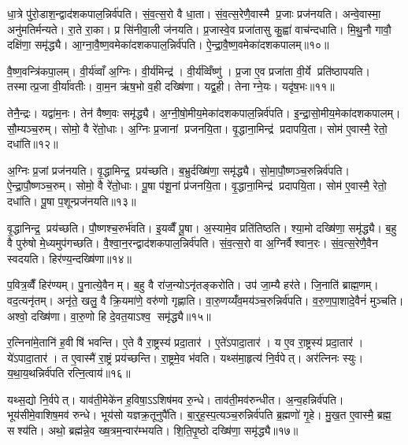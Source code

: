 धा॒त्रे पु॑रो॒डाश॒न्द्वाद॑शकपाल॒न्निर्व॑पति। सं॒व॒त्स॒रो वै धा॒ता। सं॒व॒त्स॒रेणै॒वास्मै प्र॒जाः प्रज॑नयति। अन्वे॒वास्मा॒ अनु॑मतिर्मन्यते। रा॒ते रा॒का। प्र सि॑नीवा॒ली ज॑नयति। प्र॒जास्वे॒व प्रजा॑तासु कु॒ह्वा॑ वाच॑न्दधाति। मि॒थु॒नौ गावौ॒ दक्षि॑णा॒ समृ॑द्ध्यै। आ॒ग्ना॒वै॒ष्ण॒वमेका॑दशकपाल॒न्निर्व॑पति। ऐ॒न्द्रा॒वै॒ष्ण॒वमेका॑दशकपालम्॥१०॥

वै॒ष्ण॒वन्त्रि॑कपा॒लम्। वी॒र्य॑व्वाँ अ॒ग्निः। वी॒र्य॑मिन्द्र॑। वी॒र्य॑व्विँष्णु॑। प्र॒जा ए॒व प्रजा॑ता वी॒र्ये प्रति॑ष्ठापयति। तस्मात्प्र॒जा वी॒र्या॑वतीः। वा॒म॒न ऋ॑ष॒भो व॒ही दख्षि॑णा। यद्व॒ही। तेनाग्ने॒यः। यदृ॑ष॒भः॥११॥

तेनै॒न्द्रः। यद्वा॑म॒नः। तेन॑ वैष्ण॒वः समृ॑द्ध्यै। अ॒ग्नी॒षो॒मीय॒मेका॑दशकपाल॒न्निर्व॑पति। इ॒न्द्रा॒सो॒मीय॒मेका॑दशकपालम्। सौ॒म्यञ्च॒रुम्। सोमो॒ वै रे॑तो॒धाः। अ॒ग्निः प्र॒जानां प्रजनयि॒ता। वृ॒द्धाना॒मिन्द्र॑ प्रदापयि॒ता। सोम॑ ए॒वास्मै॒ रेतो॒ दधा॑ति॥१२॥

अ॒ग्निः प्र॒जां प्रज॑नयति। वृ॒द्धामिन्द्र॒ प्रय॑च्छति। ब॒भ्रुर्दख्षि॑णा॒ समृ॑द्ध्यै। सो॒मा॒पौ॒ष्णञ्च॒रुन्निर्व॑पति। ऐ॒न्द्रा॒पौ॒ष्णञ्च॒रुम्। सोमो॒ वै रे॑तो॒धाः। पू॒षा प॑शू॒नां प्र॑जनयि॒ता। वृ॒द्धाना॒मिन्द्र॑ प्रदापयि॒ता। सोम॑ ए॒वास्मै॒ रेतो॒ दधा॑ति। पू॒षा प॒शून्प्रज॑नयति॥१३॥

वृ॒द्धानिन्द्र॒ प्रय॑च्छति। पौ॒ष्णश्च॒रुर्भ॑वति। इ॒यव्वैँ पू॒षा। अ॒स्यामे॒व प्रति॑तिष्ठति। श्या॒मो दख्षि॑णा॒ समृ॑द्ध्यै। ब॒हु वै पुरु॑षो मे॒ध्यमुप॑गच्छति। वै॒श्वा॒न॒रन्द्वाद॑शकपाल॒न्निर्व॑पति। सं॒व॒त्स॒रो वा अ॒ग्निर्वैश्वान॒रः। सं॒व॒त्स॒रेणै॒वैन स्वदयति। हिर॑ण्य॒न्दख्षि॑णा॥१४॥

प॒वित्र॒व्वैँ हिर॑ण्यम्। पु॒नात्ये॒वैनम्। ब॒हु वै रा॑ज॒न्योऽनृ॑तङ्करोति। उप॑ जा॒म्यै हर॑ते। जि॒नाति॑ ब्राह्म॒णम्। वद॒त्यनृ॑तम्। अनृ॑ते॒ खलु॒ वै क्रि॒यमा॑णे॒ वरु॑णो गृह्णाति। वा॒रु॒णय्यँ॑व॒मय॑ञ्च॒रुन्निर्व॑पति। व॒रु॒ण॒पा॒शादे॒वैनं॑ मुञ्चति। अश्वो॒ दख्षि॑णा। वा॒रु॒णो हि दे॒वत॒याऽश्व॒ समृ॑द्ध्यै॥१५॥

र॒त्निना॑मे॒तानि॑ ह॒वीषि॑ भवन्ति। ए॒ते वै रा॒ष्ट्रस्य॑ प्रदा॒तार॑। ए॒ते॑ऽपादा॒तार॑। य ए॒व रा॒ष्ट्रस्य॑ प्रदा॒तार॑। ये॑ऽपादा॒तार॑। त ए॒वास्मै॑ रा॒ष्ट्रं प्रय॑च्छन्ति। रा॒ष्ट्रमे॒व भ॑वति। यथ्स॑मा॒हृत्य॑ नि॒र्वपेत्। अर॑त्निनः स्युः। य॒था॒य॒थन्निर्व॑पति रत्नि॒त्वाय॑॥१६॥

यथ्स॒द्यो नि॒र्वपेत्। याव॑ती॒मेके॑न ह॒विषा॒ऽऽशिष॑मव रु॒न्धे। ताव॑ती॒मव॑रुन्धीत। अ॒न्व॒हन्निर्व॑पति। भूय॑सीमे॒वाशिष॒मव॑ रुन्धे। भूय॑सो यज्ञक्र॒तूनुपै॑ति। बा॒र्॒ह॒स्प॒त्यञ्च॒रुन्निर्व॑पति ब्र॒ह्मणो॑ गृ॒हे। मु॒ख॒त ए॒वास्मै॒ ब्रह्म॒ सश्य॑ति। अथो॒ ब्रह्म॑न्ने॒व ख्ष॒त्रम॒न्वार॑म्भयति। शि॒ति॒पृ॒ष्ठो दख्षि॑णा॒ समृ॑द्ध्यै॥१७॥

